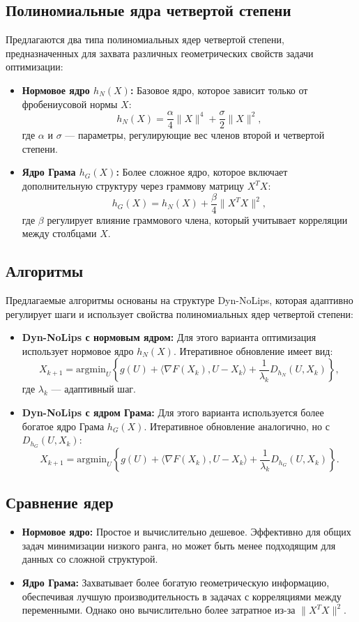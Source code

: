 \documentclass[a4paper,11pt]{article}
\begin{document}
\subsection{Полиномиальные ядра четвертой степени}
Предлагаются два типа полиномиальных ядер четвертой степени, предназначенных для захвата различных геометрических свойств задачи оптимизации:
\begin{itemize}
    \item \textbf{Нормовое ядро \(h_N(X)\):} Базовое ядро, которое зависит только от фробениусовой нормы \(X\):
    \[
    h_N(X) = \frac{\alpha}{4}\|X\|^4 + \frac{\sigma}{2}\|X\|^2,
    \]
    где \(\alpha\) и \(\sigma\) — параметры, регулирующие вес членов второй и четвертой степени.
    \item \textbf{Ядро Грама \(h_G(X)\):} Более сложное ядро, которое включает дополнительную структуру через граммову матрицу \(X^TX\):
    \[
    h_G(X) = h_N(X) + \frac{\beta}{4}\|X^TX\|^2,
    \]
    где \(\beta\) регулирует влияние граммового члена, который учитывает корреляции между столбцами \(X\).
\end{itemize}

\subsection{Алгоритмы}
Предлагаемые алгоритмы основаны на структуре Dyn-NoLips, которая адаптивно регулирует шаги и использует свойства полиномиальных ядер четвертой степени:
\begin{itemize}
    \item \textbf{Dyn-NoLips с нормовым ядром:}
    Для этого варианта оптимизация использует нормовое ядро \(h_N(X)\). Итеративное обновление имеет вид:
    \[
    X_{k+1} = \text{argmin}_U \left\{ g(U) + \langle \nabla F(X_k), U - X_k \rangle + \frac{1}{\lambda_k} D_{h_N}(U, X_k) \right\},
    \]
    где \(\lambda_k\) — адаптивный шаг.
    \item \textbf{Dyn-NoLips с ядром Грама:}
    Для этого варианта используется более богатое ядро Грама \(h_G(X)\). Итеративное обновление аналогично, но с \(D_{h_G}(U, X_k)\):
    \[
    X_{k+1} = \text{argmin}_U \left\{ g(U) + \langle \nabla F(X_k), U - X_k \rangle + \frac{1}{\lambda_k} D_{h_G}(U, X_k) \right\}.
    \]
\end{itemize}

\subsection{Сравнение ядер}
\begin{itemize}
\item \textbf{Нормовое ядро:} Простое и вычислительно дешевое. Эффективно для общих задач минимизации низкого ранга, но может быть менее подходящим для данных со сложной структурой.
    \item \textbf{Ядро Грама:} Захватывает более богатую геометрическую информацию, обеспечивая лучшую производительность в задачах с корреляциями между переменными. Однако оно вычислительно более затратное из-за \(\|X^TX\|^2\).
\end{itemize}
\end{document}
